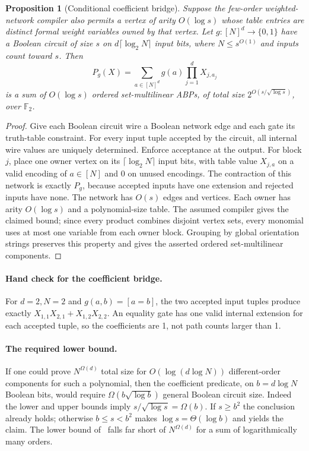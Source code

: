 \documentclass[11pt]{article}
\newtheorem{proposition}[theorem]{Proposition}
\theoremstyle{definition}
\theoremstyle{remark}
\begin{document}
\begin{proposition}[Conditional coefficient bridge]
\label{prop:coefficient-bridge}
Suppose the few-order weighted-network compiler also permits a
vertex of arity $O(\log s)$ whose table entries are distinct formal
weight variables owned by that vertex.
Let $g:[N]^d\to\{0,1\}$ have a Boolean circuit of size $s$ on
$d\lceil\log_2N\rceil$ input bits, where $N\le s^{O(1)}$ and inputs
count toward $s$.  Then
\[
 P_g(X)=\sum_{a\in[N]^d}g(a)\prod_{j=1}^{d}X_{j,a_j}
\]
is a sum of $O(\log s)$ ordered set-multilinear ABPs, of total size
$2^{O(s/\sqrt{\log s})}$, over $\mathbb F_2$.
\end{proposition}
\begin{proof}
Give each Boolean circuit wire a Boolean network edge and each gate
its truth-table constraint.  For every input tuple accepted by the
circuit, all internal wire values are uniquely determined.
Enforce acceptance at the output.  For block $j$, place one owner
vertex on its $\lceil\log_2N\rceil$ input bits, with table value
$X_{j,a}$ on a valid encoding of $a\in[N]$ and 0 on unused encodings.
The contraction of this network is exactly $P_g$, because accepted
inputs have one extension and rejected inputs have none.
The network has $O(s)$ edges and vertices.  Each owner has arity
$O(\log s)$ and a polynomial-size table.
The assumed compiler gives the claimed bound; since every product
combines disjoint vertex sets, every monomial uses at most one
variable from each owner block.  Grouping by global orientation
strings preserves this property and gives the asserted ordered
set-multilinear components.
\end{proof}

\paragraph{Hand check for the coefficient bridge.}
For $d=2,N=2$ and $g(a,b)=[a=b]$, the two accepted input tuples
produce exactly
$X_{1,1}X_{2,1}+X_{1,2}X_{2,2}$.
An equality gate has one valid internal extension for each accepted
tuple, so the coefficients are 1, not path counts larger than 1.

\paragraph{The required lower bound.}
If one could prove $N^{\Omega(d)}$ total size for
$O(\log(d\log N))$ different-order components for such a polynomial,
then the coefficient predicate, on $b=d\log N$ Boolean bits,
would require $\Omega(b\sqrt{\log b})$ general Boolean circuit size.
Indeed the lower and upper bounds imply
$s/\sqrt{\log s}=\Omega(b)$.
If $s\ge b^2$ the conclusion already holds; otherwise
$b\le s<b^2$ makes $\log s=\Theta(\log b)$ and yields the claim.
The lower bound of~\cite{CKSS24} falls far short of
$N^{\Omega(d)}$ for a sum of logarithmically many orders.
\end{document}
